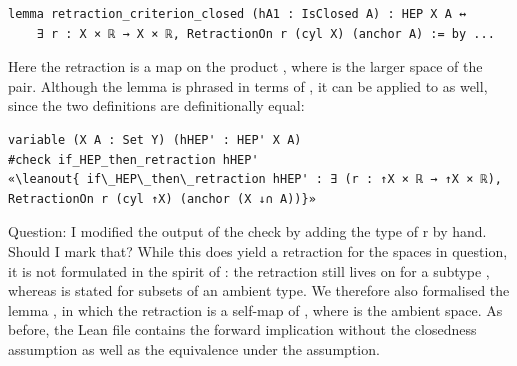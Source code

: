 \documentclass[11pt, a4paper, english]{article}
\newcommand{\leanout}[1]{{\normalfont\ttfamily\color{leanOutput} #1}}
\theoremstyle{plain}
\theoremstyle{definition}
\theoremstyle{remark}
\numberwithin{equation}{section}
\numberwithin{theorem}{section}
\begin{document}
\begin{verbatim}
lemma retraction_criterion_closed (hA1 : IsClosed A) : HEP X A ↔ 
    ∃ r : X × ℝ → X × ℝ, RetractionOn r (cyl X) (anchor A) := by ...
\end{verbatim}

Here the retraction is a map on the product , where  is the larger space of the pair. Although the lemma is phrased in terms of , it can be applied to  as well, since the two definitions are definitionally equal:

\begin{verbatim}
variable (X A : Set Y) (hHEP' : HEP' X A)
#check if_HEP_then_retraction hHEP'
«\leanout{ if\_HEP\_then\_retraction hHEP' : ∃ (r : ↑X × ℝ → ↑X × ℝ), RetractionOn r (cyl ↑X) (anchor (X ↓∩ A))}»
\end{verbatim}
Question: I modified the output of the check by adding the type of r by hand. Should I mark that?
While this does yield a retraction for the spaces in question, it is not formulated in the spirit of : the retraction still lives on  for a subtype , whereas  is stated for subsets of an ambient type. We therefore also formalised the lemma , in which the retraction is a self-map of , where  is the ambient space. As before, the Lean file contains the forward implication without the closedness assumption as well as the equivalence under the assumption.
\end{document}
